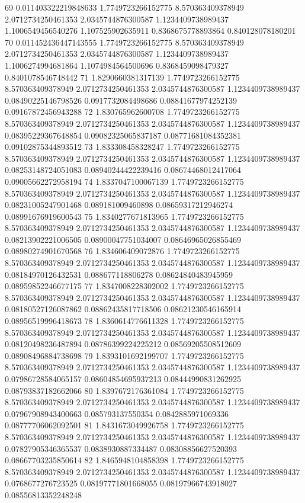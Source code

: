 {69 0.011403322219848633 1.7749723266152775 8.570363409378949 2.0712734250461353 2.0345744876300587 1.1234409738989437 1.1006549456540276 1.107525902635911 0.8368675778893864 0.840128078180201
70 0.011452436447143555 1.7749723266152775 8.570363409378949 2.0712734250461353 2.0345744876300587 1.1234409738989437 1.1006274994681864 1.1074984564500696 0.8368459098479327 0.8401078546748442
71 1.8290660381317139 1.7749723266152775 8.570363409378949 2.0712734250461353 2.0345744876300587 1.1234409738989437 0.08490225146798526 0.0917732084498686 0.08841677974252139 0.09167872456943288
72 1.830765962600708 1.7749723266152775 8.570363409378949 2.0712734250461353 2.0345744876300587 1.1234409738989437 0.08395229367648854 0.09082325065837187 0.08771681084352381 0.09102875344893512
73 1.833308458328247 1.7749723266152775 8.570363409378949 2.0712734250461353 2.0345744876300587 1.1234409738989437 0.08253148724051083 0.08940244422239416 0.08674468012417064 0.09005662272958194
74 1.8337047100067139 1.7749723266152775 8.570363409378949 2.0712734250461353 2.0345744876300587 1.1234409738989437 0.08231005247901468 0.089181009460898 0.08659317212946274 0.08991676919600543
75 1.8340277671813965 1.7749723266152775 8.570363409378949 2.0712734250461353 2.0345744876300587 1.1234409738989437 0.08213902221006505 0.08900047751034007 0.08646965026855469 0.08980274901670568
76 1.834606409072876 1.7749723266152775 8.570363409378949 2.0712734250461353 2.0345744876300587 1.1234409738989437 0.08184970126432531 0.088677118806278 0.08624840483945959 0.08959852246677175
77 1.8347008228302002 1.7749723266152775 8.570363409378949 2.0712734250461353 2.0345744876300587 1.1234409738989437 0.08180527126087862 0.08862435817718506 0.08621230546165914 0.08956519996418673
78 1.8360614776611328 1.7749723266152775 8.570363409378949 2.0712734250461353 2.0345744876300587 1.1234409738989437 0.08120498236487894 0.08786399224225212 0.08569205508512609 0.08908496884738698
79 1.8393101692199707 1.7749723266152775 8.570363409378949 2.0712734250461353 2.0345744876300587 1.1234409738989437 0.07986728584065157 0.08604854695937213 0.08444990831262925 0.08793837182662066
80 1.8397672176361084 1.7749723266152775 8.570363409378949 2.0712734250461353 2.0345744876300587 1.1234409738989437 0.07967908943400663 0.085793137550354 0.0842885971069336 0.08777706062092501
81 1.8431673049926758 1.7749723266152775 8.570363409378949 2.0712734250461353 2.0345744876300587 1.1234409738989437 0.07827905346365537 0.0838930887334487 0.08308856627520393 0.08667703235850614
82 1.8465948104858398 1.7749723266152775 8.570363409378949 2.0712734250461353 2.0345744876300587 1.1234409738989437 0.0768677276723525 0.08197771801668055 0.08197966743918027 0.08556813352248248
}
